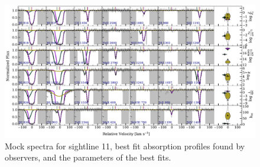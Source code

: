 \documentclass[fleqn,usenatbib]{mnras}
\begin{document}
\begin{figure}
    \centering
    \includegraphics[width=\textwidth]{figures/sample2/best_fits/0011.pdf}
    \caption{
    Mock spectra for sightline 11,
    best fit absorption profiles found by observers,
    and the parameters of the best fits.
    }
    \label{f: sample2 spectrum 11}
\end{figure}
\end{document}
